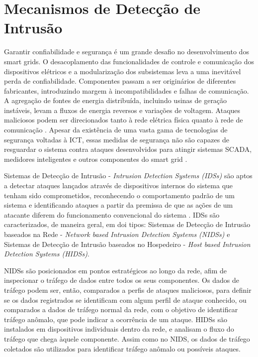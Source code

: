 \documentclass[cic,tc]{iiufrgs}
\begin{document}
\section{Mecanismos de Detecção de Intrusão}
\label{secmec}
Garantir confiabilidade e segurança é um grande desafio no desenvolvimento dos smart grids. O desacoplamento das funcionalidades de controle e comunicação dos dispositivos elétricos e a modularização dos subsistemas leva a uma inevitável perda de confiabilidade. Componentes passam a ser originários de diferentes fabricantes, introduzindo margem à incompatibilidades e falhas de comunicação. A agregação de fontes de energia distribuída, incluindo usinas de geração instáveis, levam a fluxos de energia reversos e variações de voltagem. Ataques maliciosos podem ser direcionados tanto à rede elétrica física quanto à rede de comunicação \cite{li2012securing}. Apesar da existência de uma vasta gama de tecnologias de segurança voltadas à ICT, essas medidas de segurança não são capazes de resguardar o sistema contra ataques desenvolvidos para atingir sistemas SCADA, medidores inteligentes e outros componentes do smart grid \cite{carcano2011multidim}.

Sistemas de Detecção de Intrusão - \emph{Intrusion Detection Systems (IDSs)} são aptos a detectar ataques lançados através de dispositivos internos do sistema que tenham sido comprometidos, reconhecendo o comportamento padrão de um sistema e identificando ataques a partir da premissa de que as ações de um atacante diferem do funcionamento convencional do sistema \cite{li2012securing}. IDSs são caracterizados, de maneira geral, em doi tipos: Sistemas de Detecção de Intrusão baseados na Rede - \emph{Network based Intrusion Detection Systems (NIDSs)} e Sistemas de Detecção de Intrusão baseados no Hospedeiro - \emph{Host based Intrusion Detection Systems (HIDSs)}.

NIDSs são posicionados em pontos estratégicos ao longo da rede, afim de inspecionar o tráfego de dados entre todos os seus componentes. Os dados de tráfego podem ser, então, comparados a perfis de ataques maliciosos, para definir se os dados registrados se identificam com algum perfil de ataque conhecido, ou comparados a dados de tráfego normal da rede, com o objetivo de identificar tráfego anômalo, que pode indicar a ocorrência de um ataque. HIDSs são instalados em dispositivos individuais dentro da rede, e analisam o fluxo do tráfego que chega àquele componente. Assim como no NIDS, os dados de tráfego coletados são utilizados para identificar tráfego anômalo ou possíveis ataques.
\end{document}
